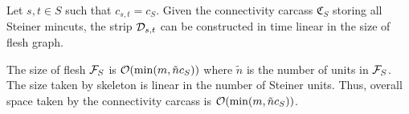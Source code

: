 \begin{lemma}
\label{lem:strip-from-carcass}
Let $s,t \in S$ such that $c_{s,t}=c_S$. Given the connectivity carcass ${\mathfrak C}_S$ storing all Steiner mincuts, the strip ${\cal D}_{s,t}$ can be constructed in time linear in the size of flesh graph.
\end{lemma}

The size of flesh ${\cal F}_S$ is ${\cal O}(\min(m,\tilde{n}c_S))$ where $\tilde{n}$ is the number of units in ${\cal F}_S$. The size taken by skeleton is linear in the number of Steiner units. Thus, overall space taken by the connectivity carcass is ${\cal O}(\min(m,\tilde{n}c_S))$.